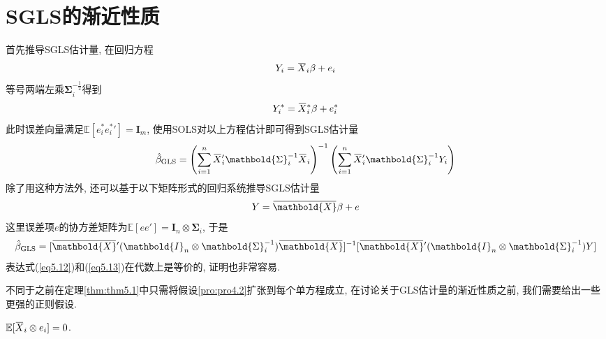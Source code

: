 \documentclass[cn, 12pt, math=mtpro2, bibstyle=apa, blue, twocol]{elegantbook}
\newcommand{\E}{\mathbb{E}}
\newcommand{\X}{\mathbold{X}}
\newcommand{\hb}{\hat{\beta}}
\newcommand{\overbar}[1]{\mkern 1.5mu\overline{\mkern-1.5mu#1\mkern-1.5mu}\mkern 1.5mu}
\begin{document}
\section{SGLS的渐近性质}
首先推导SGLS估计量, 在回归方程
$$Y_i=\overbar{X}_i\beta+e_i$$
等号两端左乘$\mathbold{\Sigma}_i^{-\frac{1}{2}}$得到
$$Y_i^\ast=\overbar{X}_i^\ast\beta+e_i^\ast$$
此时误差向量满足$\E[e_i^\ast e_i^\ast{'}]=\mathbold{I}_m$, 使用SOLS对以上方程估计即可得到SGLS估计量
\begin{equation}\label{eq5.12}
  \hb_\text{GLS}=\left(\sum_{i=1}^{n}\overbar{X}_i'\mathbold{\Sigma}_i^{-1}\overbar{X}_i\right)^{-1}\left(\sum_{i=1}^{n}\overbar{X}_i'\mathbold{\Sigma}_i^{-1}Y_i\right)
\end{equation}
除了用这种方法外, 还可以基于以下矩阵形式的回归系统推导SGLS估计量
$$Y=\overbar{\X}\beta+e$$
这里误差项$e$的协方差矩阵为$\E[ee']=\mathbold{I}_n\otimes \mathbold{\Sigma}_i$, 于是
\begin{equation}\label{eq5.13}
  \hb_\text{GLS}=[\overbar{\X}'(\mathbold{I}_n\otimes\mathbold{\Sigma}_i^{-1})\overbar{\X}]^{-1}[\overbar{\X}'(\mathbold{I}_n\otimes\mathbold{\Sigma}_i^{-1})Y]
\end{equation}
表达式(\ref{eq5.12})和(\ref{eq5.13})在代数上是等价的, 证明也非常容易.

不同于之前在定理\ref{thm:thm5.1}中只需将假设\ref{pro:pro4.2}扩张到每个单方程成立, 在讨论关于GLS估计量的渐近性质之前, 我们需要给出一些更强的正则假设.

\begin{proposition}\label{pro:pro5.1}
$\E[\overbar{X}_i\otimes e_i]=0$.
\end{proposition}
\end{document}

